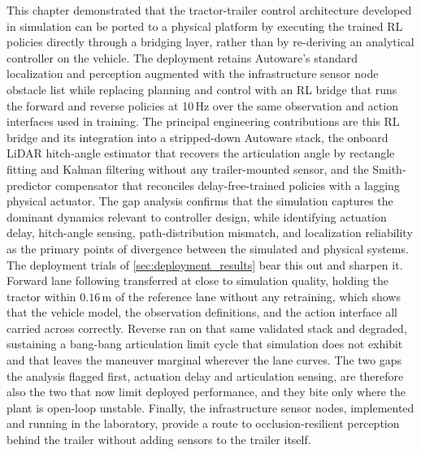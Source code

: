 This chapter demonstrated that the tractor-trailer control architecture developed in simulation can be ported to a physical platform by executing the trained RL policies directly through a bridging layer, rather than by re-deriving an analytical controller on the vehicle. The deployment retains Autoware's standard localization and perception augmented with the infrastructure sensor node obstacle list while replacing planning and control with an RL bridge that runs the forward and reverse policies at 10\,Hz over the same observation and action interfaces used in training. The principal engineering contributions are this RL bridge and its integration into a stripped-down Autoware stack, the onboard LiDAR hitch-angle estimator that recovers the articulation angle by rectangle fitting and Kalman filtering without any trailer-mounted sensor, and the Smith-predictor compensator that reconciles delay-free-trained policies with a lagging physical actuator. The gap analysis confirms that the simulation captures the dominant dynamics relevant to controller design, while identifying actuation delay, hitch-angle sensing, path-distribution mismatch, and localization reliability as the primary points of divergence between the simulated and physical systems. The deployment trials of \cref{sec:deployment_results} bear this out and sharpen it. Forward lane following transferred at close to simulation quality, holding the tractor within $0.16$\,m of the reference lane without any retraining, which shows that the vehicle model, the observation definitions, and the action interface all carried across correctly. Reverse ran on that same validated stack and degraded, sustaining a bang-bang articulation limit cycle that simulation does not exhibit and that leaves the maneuver marginal wherever the lane curves. The two gaps the analysis flagged first, actuation delay and articulation sensing, are therefore also the two that now limit deployed performance, and they bite only where the plant is open-loop unstable. Finally, the infrastructure sensor nodes, implemented and running in the laboratory, provide a route to occlusion-resilient perception behind the trailer without adding sensors to the trailer itself.
